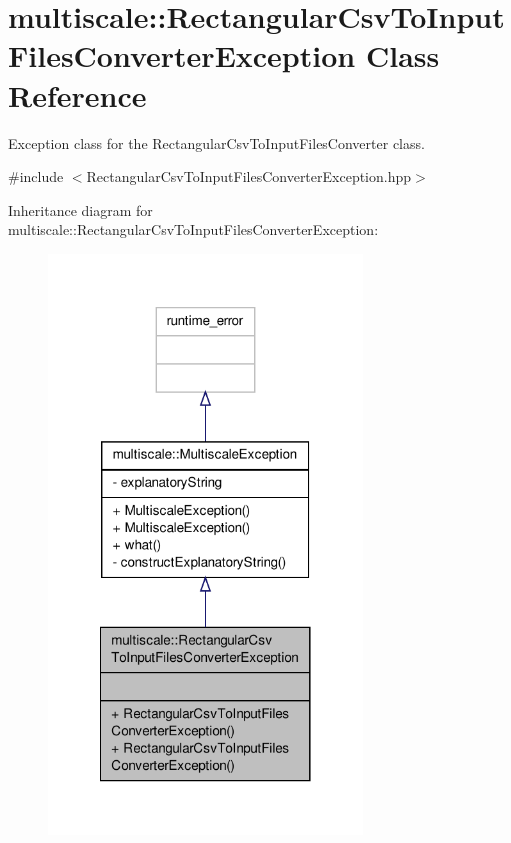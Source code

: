 \hypertarget{classmultiscale_1_1RectangularCsvToInputFilesConverterException}{\section{multiscale\-:\-:Rectangular\-Csv\-To\-Input\-Files\-Converter\-Exception Class Reference}
\label{classmultiscale_1_1RectangularCsvToInputFilesConverterException}
}


Exception class for the Rectangular\-Csv\-To\-Input\-Files\-Converter class.  




{\ttfamily \#include $<$Rectangular\-Csv\-To\-Input\-Files\-Converter\-Exception.\-hpp$>$}



Inheritance diagram for multiscale\-:\-:Rectangular\-Csv\-To\-Input\-Files\-Converter\-Exception\-:
\nopagebreak
\begin{figure}[H]
\begin{center}
\leavevmode
\includegraphics[width=236pt]{classmultiscale_1_1RectangularCsvToInputFilesConverterException__inherit__graph}
\end{center}
\end{figure}



